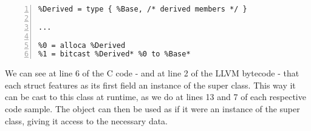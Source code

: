\begin{lstlisting}[frame=single, numbers=left, numberstyle=\tiny, title= LLVM IR]
%Base = type { /* base members */ }
%Derived = type { %Base, /* derived members */ }

...

%0 = alloca %Derived
%1 = bitcast %Derived* %0 to %Base*
\end{lstlisting}

We can see at line 6 of the C code - and at line 2 of the LLVM bytecode - that each struct features as its first field an instance of the super class. This way it can be cast to this class at runtime, as we do at lines 13 and 7 of each respective code sample. The object can then be used as if it were an instance of the super class, giving it access to the necessary data.
